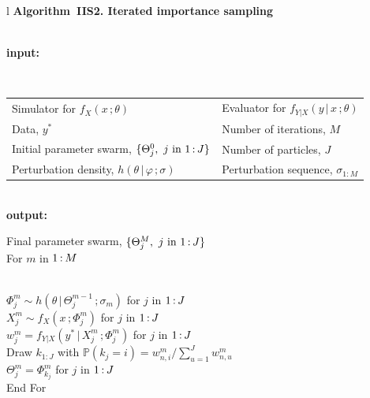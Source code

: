 \documentclass[11pt]{article}
\newcommand\IIS{IIS2}
\newcommand\asp{\hspace{4mm}}
\newcommand\prob{\mathbb{P}}
\newcommand\given{{\, | \,}}
\newcommand\giventh{\,;}
\newcommand\mycolon{{\hspace{0.6mm}:\hspace{0.6mm}}}
\begin{document}
\begin{center}
\noindent\begin{tabular}{l}
\hline
{\bf Algorithm~{\IIS}. Iterated importance sampling}\rule[-1.5mm]{0mm}{6mm}\\
\hline
{\bf input:}\rule[-1.5mm]{0mm}{6mm} \\
\begin{tabular}{ll}
Simulator for $f_{X}(x\giventh\theta)$ &
Evaluator for $f_{Y|X}(y\given x\giventh\theta)$\\
Data, $y^*$ &
Number of iterations, $M$ \\
Initial parameter swarm, $\{\Theta^0_j, \mbox{ $j$ in $1\mycolon J$}\}$ &
Number of particles, $J$ \\
Perturbation density, $h(\theta\given\varphi\giventh\sigma)$&
Perturbation sequence, $\sigma_{1:M}$ 
\end{tabular}\\
{\bf output:}\rule[-1.5mm]{0mm}{6mm} 
Final parameter swarm, $\{\Theta^M_j, \mbox{ $j$ in $1\mycolon J$}\}$ \\
For $m$ in $1\mycolon M$\rule[0mm]{0mm}{5mm}\\
\asp     $\Phi^{m}_{j}\sim h(\theta\given\Theta^{m-1}_{j}\giventh \sigma_m)$ for $j$ in $1\mycolon J$\\
\asp     $X_{j}^{m}\sim f_{X}(x\giventh \Phi^{m}_{j})$ for $j$ in $1\mycolon J$\\
\asp  $w_{j}^m = f_{Y|X}(y^*\given X_{j}^{m}\giventh \Phi^{m}_{j})$ for $j$ in $1\mycolon J$ \\
\asp  Draw $k_{1:J}$ with $\prob(k_j=i)=  w_{n,i}^m\Big/\sum_{u=1}^J w_{n,u}^m$  \\
\asp  $\Theta^{m}_{j}=\Phi^{m}_{k_j}$ for $j$ in $1\mycolon J$  \\
End For\\
\hline
\end{tabular}
\end{center}

\vspace{5mm}
\end{document}
